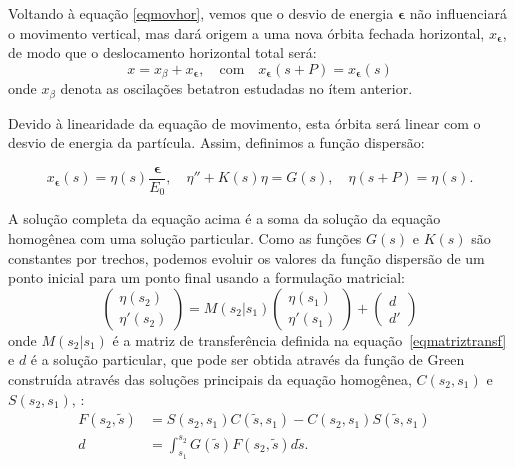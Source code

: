 Voltando à equação \ref{eqmovhor}, vemos que o desvio de energia $\boldsymbol{\epsilon}$ não influenciará o movimento vertical, mas dará origem a uma nova órbita fechada horizontal, $x_{\boldsymbol{\epsilon}}$, de modo que o deslocamento horizontal total será:
\begin{equation}
 x = x_\beta + x_{\boldsymbol{\epsilon}},\quad\mathrm{com}\quad
x_{\boldsymbol{\epsilon}}(s+P) = x_{\boldsymbol{\epsilon}}(s)
\end{equation}
onde $x_\beta$ denota as oscilações betatron estudadas no ítem anterior.

Devido à linearidade da equação de movimento, esta órbita será linear com o desvio de energia da partícula. Assim, definimos a função dispersão:

\begin{equation}
 x_{\boldsymbol{\epsilon}} (s) = \eta(s) \frac{\boldsymbol{\epsilon}}{E_0},\quad
\eta'' + K(s)\eta=G(s),
\quad \eta(s+P)=\eta(s).
\end{equation}

A solução completa da equação acima é a soma da solução da equação homogênea com uma solução particular. Como as funções $G(s)$ e $K(s)$ são constantes por trechos, podemos evoluir os valores da função dispersão de um ponto inicial para um ponto final usando a formulação matricial:
\begin{equation}
 \left(\begin{array}{c}
        \eta(s_2) \\
        \eta'(s_2)
       \end{array}\right)
 = M(s_2|s_1)
 \left(\begin{array}{c}
        \eta(s_1) \\
        \eta'(s_1)
       \end{array}\right)
 +
 \left(\begin{array}{c}
        d \\
        d'
       \end{array}\right)
\end{equation}
onde $M(s_2|s_1)$ é a matriz de transferência definida na \mbox{equação \ref{eqmatriztransf}} e $d$ é a solução particular, que pode ser obtida através da função de Green construída através das soluções principais da equação homogênea, $C(s_2,s_1)$ e $S(s_2,s_1)$, \cite{Wiedemann3}:
\begin{align}
 F(s_2,\tilde{s}) &= S(s_2,s_1) C(\tilde{s},s_1) - C(s_2,s_1) S(\tilde{s},s_1)
\\
d &= \int^{s_2}_{s_1} G(\tilde{s}) F(s_2,\tilde{s}) d \tilde{s}. &
\end{align}

